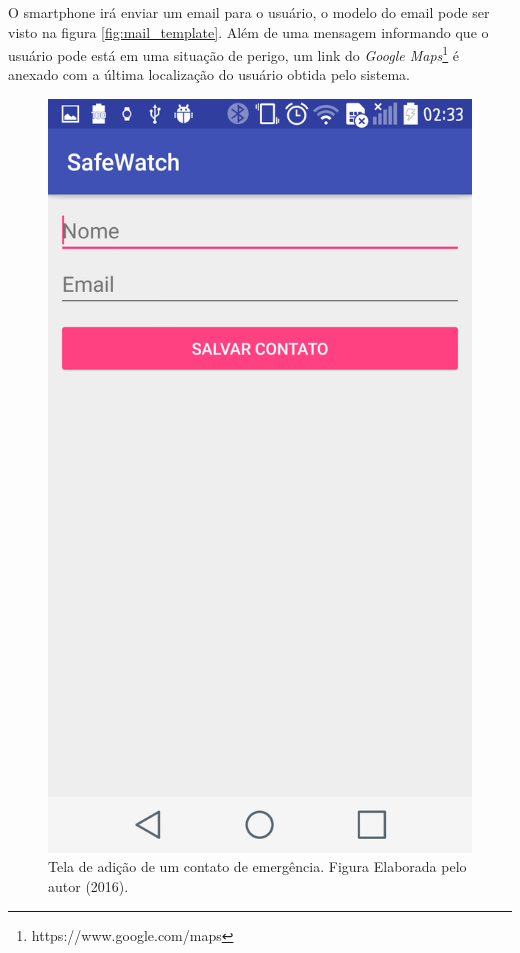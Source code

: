 O smartphone irá enviar um email para o usuário, o modelo do email pode ser visto na figura \ref{fig:mail_template}. Além de uma mensagem informando que o usuário pode está em uma situação de perigo, um link do \textit{Google Maps}\footnote{https://www.google.com/maps} é anexado com a última localização do usuário obtida pelo sistema. 


\begin{figure}[ht]
	\centering
	\includegraphics[scale=0.3]{imagens/tela_adicionar_contatos.png}
	\caption{Tela de adição de um contato de emergência. Figura Elaborada pelo autor (2016).}
	\label{fig:add_contact}
\end{figure} 


